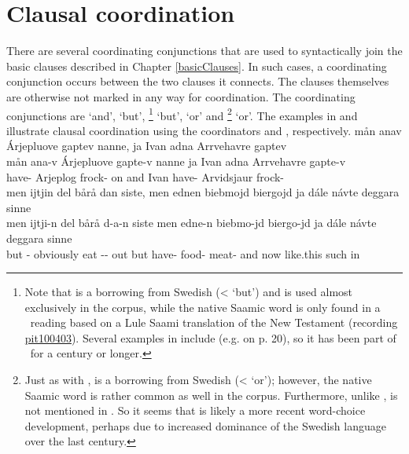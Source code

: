 \section{Clausal coordination}\label{clausalCoordination}
There are several coordinating conjunctions that are used to syntactically join the basic clauses described in Chapter \ref{basicClauses}. In such cases, a coordinating conjunction occurs between the two clauses it connects. The clauses themselves are otherwise not marked in any way for coordination. The coordinating conjunctions are  ‘and’,  ‘but’, \footnote{Note that  is a borrowing from Swedish (<  ‘but’) and is used almost exclusively in the corpus, while the native Saamic word  is only found in a \PS\ reading based on a Lule Saami translation of the New Testament (recording \hyperlink{pit100403}{pit100403}). Several examples in \citet{Lagercrantz1926} include  (e.g. on p. 20), so it has been part of \PS\ for a century or longer.} 
‘but’,  ‘or’ and \footnote{Just as with ,  is a borrowing from Swedish (<  ‘or’); however, the native Saamic word  is rather common as well in the corpus. Furthermore, unlike ,  is not mentioned in \citet{Lagercrantz1926}. So it seems that  is likely a more recent word-choice development, perhaps due to increased dominance of the Swedish language over the last century.} 
‘or’. The examples in  and  illustrate clausal coordination using the coordinators  and , respectively.
\ea\label{coordination1}
\glll	mån anav Árjepluove gaptev nanne, ja Ivan adna Arrvehavre gaptev\\
	mån ana-v Árjepluove gapte-v nanne ja Ivan adna Arrvehavre gapte-v\\
	 have- Arjeplog\BS{} frock- on and Ivan have- Arvidsjaur\BS{} frock-\\\nopagebreak
{} 
\z
\ea\label{coordination2}
\glll	men ijtjin del bårå dan siste, men ednen biebmojd biergojd ja dále návte deggara sinne\\
	men ijtji-n del bårå d-a-n siste men edne-n biebmo-jd biergo-jd ja dále návte deggara sinne\\
	but - obviously eat\BS{} -- out but have- food- meat- and now like.this such\BS{} in\\\nopagebreak
{} 
\z

